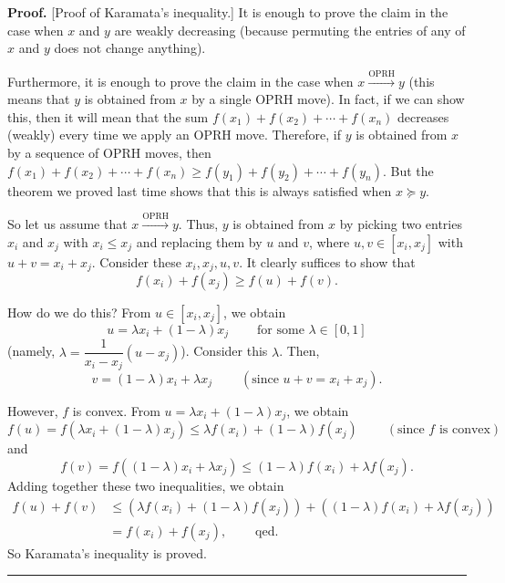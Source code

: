 \documentclass[numbers=enddot,12pt,final,onecolumn,notitlepage]{scrartcl}%
\numberwithin{exer}{subsection}
\theoremstyle{definition}
\newenvironment{proof}[1][Proof]{\noindent\textbf{#1.} }{\ \rule{0.5em}{0.5em}}
\begin{document}
\begin{proof}
[Proof of Karamata's inequality.] It is enough to prove the claim in the case
when $x$ and $y$ are weakly decreasing (because permuting the entries of any
of $x$ and $y$ does not change anything).

Furthermore, it is enough to prove the claim in the case when
$x\overset{\text{OPRH}}{\longrightarrow}y$ (this means that $y$ is obtained
from $x$ by a single OPRH move). In fact, if we can show this, then it will
mean that the sum $f\left(  x_{1}\right)  +f\left(  x_{2}\right)
+\cdots+f\left(  x_{n}\right)  $ decreases (weakly) every time we apply an
OPRH move. Therefore, if $y$ is obtained from $x$ by a sequence of OPRH moves,
then $f\left(  x_{1}\right)  +f\left(  x_{2}\right)  +\cdots+f\left(
x_{n}\right)  \geq f\left(  y_{1}\right)  +f\left(  y_{2}\right)
+\cdots+f\left(  y_{n}\right)  $. But the theorem we proved last time shows
that this is always satisfied when $x\succcurlyeq y$.

So let us assume that $x\overset{\text{OPRH}}{\longrightarrow}y$. Thus, $y$ is
obtained from $x$ by picking two entries $x_{i}$ and $x_{j}$ with $x_{i}\leq
x_{j}$ and replacing them by $u$ and $v$, where $u,v\in\left[  x_{i}%
,x_{j}\right]  $ with $u+v=x_{i}+x_{j}$. Consider these $x_{i},x_{j},u,v$. It
clearly suffices to show that%
\[
f\left(  x_{i}\right)  +f\left(  x_{j}\right)  \geq f\left(  u\right)
+f\left(  v\right)  .
\]


How do we do this? From $u\in\left[  x_{i},x_{j}\right]  $, we obtain
\[
u=\lambda x_{i}+\left(  1-\lambda\right)  x_{j}\ \ \ \ \ \ \ \ \ \ \text{for
some }\lambda\in\left[  0,1\right]
\]
(namely, $\lambda=\dfrac{1}{x_{i}-x_{j}}\left(  u-x_{j}\right)  $). Consider
this $\lambda$. Then,%
\[
v=\left(  1-\lambda\right)  x_{i}+\lambda x_{j}\ \ \ \ \ \ \ \ \ \ \left(
\text{since }u+v=x_{i}+x_{j}\right)  .
\]


However, $f$ is convex. From $u=\lambda x_{i}+\left(  1-\lambda\right)  x_{j}%
$, we obtain%
\[
f\left(  u\right)  =f\left(  \lambda x_{i}+\left(  1-\lambda\right)
x_{j}\right)  \leq\lambda f\left(  x_{i}\right)  +\left(  1-\lambda\right)
f\left(  x_{j}\right)  \ \ \ \ \ \ \ \ \ \ \left(  \text{since }f\text{ is
convex}\right)
\]
and%
\[
f\left(  v\right)  =f\left(  \left(  1-\lambda\right)  x_{i}+\lambda
x_{j}\right)  \leq\left(  1-\lambda\right)  f\left(  x_{i}\right)  +\lambda
f\left(  x_{j}\right)  .
\]
Adding together these two inequalities, we obtain%
\begin{align*}
f\left(  u\right)  +f\left(  v\right)    & \leq\left(  \lambda f\left(
x_{i}\right)  +\left(  1-\lambda\right)  f\left(  x_{j}\right)  \right)
+\left(  \left(  1-\lambda\right)  f\left(  x_{i}\right)  +\lambda f\left(
x_{j}\right)  \right)  \\
& =f\left(  x_{i}\right)  +f\left(  x_{j}\right)
,\ \ \ \ \ \ \ \ \ \ \text{qed.}%
\end{align*}
So Karamata's inequality is proved.
\end{proof}
\end{document}
